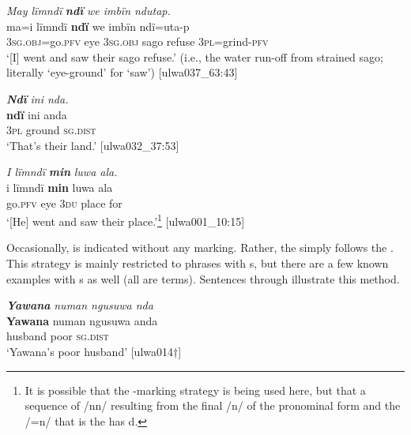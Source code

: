 
\newpage


\ea%
    \label{ex:phrase:26}
          \textit{May lïmndï} \textbf{\textit{ndï}} \textit{we imbïn ndutap.}\\
\gll    ma=i        lïmndï  \textbf{ndï}      we     imbïn  ndï=uta-p\\
    3\textsc{sg.obj}=go.\textsc{pfv}  eye    3\textsc{sg.obj}  sago  refuse  3\textsc{pl}=grind-\textsc{pfv}\\
\glt `[I] went and saw their sago refuse.’ (i.e., the water run-off from strained sago;   literally ‘eye-ground’ for ‘saw’) [ulwa037\_63:43]
\z

\ea%
    \label{ex:phrase:27}
          \textbf{\textit{Ndï}} \textit{ini nda.}\\
\gll    \textbf{ndï}  ini    anda\\
    3\textsc{pl}  ground  \textsc{sg.dist}\\
\glt `That’s their land.’ [ulwa032\_37:53]
\z

\ea%
    \label{ex:phrase:28}
          \textit{I lïmndï} \textbf{\textit{min}} \textit{luwa ala.}\\
\gll    i    lïmndï  \textbf{min}  luwa  ala\\
    go.\textsc{pfv}  eye    3\textsc{du}  place  for\\
\glt `[He] went and saw their place.’\footnote{It is possible that the -marking strategy is being used here, but that a sequence of /nn/ resulting from the final /n/ of the  pronominal form and the /=n/ that is the  has d.} [ulwa001\_10:15]
\z

  Occasionally,  is indicated without any marking. Rather, the  simply follows the . This strategy is mainly restricted to phrases with  s, but there are a few known examples with  s as well (all are  terms). Sentences  through  illustrate this  method.

\ea%
    \label{ex:phrase:29}
          \textbf{\textit{Yawana}} \textit{numan ngusuwa nda}\\
\gll \textbf{Yawana}  numan    ngusuwa  anda\\
    [name]    husband  poor    \textsc{sg.dist}\\
\glt `Yawana’s poor husband’ [ulwa014†]
\z

